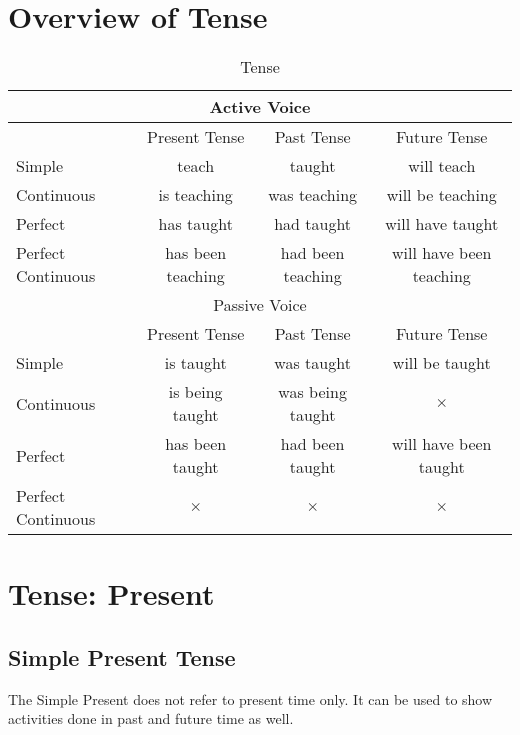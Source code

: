 \onecolumn
\section{Overview of Tense}
\begin{table}[h]
    \centering
    \begin{tabular}{|l|c|c|c|}
        \hline
        \multicolumn{4}{|c|}{Active Voice} \\ \hline
        & Present Tense & Past Tense & Future Tense \\ \hline
        Simple & teach & taught & will teach \\ \hline
        Continuous & is teaching & was teaching & will be teaching \\ \hline
        Perfect & has taught & had taught & will have taught \\ \hline
        Perfect Continuous & has been teaching & had been teaching & will have been teaching \\ \hline \hline
        \multicolumn{4}{|c|}{Passive Voice} \\ \hline
        & Present Tense & Past Tense & Future Tense \\ \hline
        Simple & is taught & was taught & will be taught \\ \hline
        Continuous & is being taught & was being taught & $\times$ \\ \hline
        Perfect & has been taught & had been taught & will have been taught \\ \hline
        Perfect Continuous & $\times$ & $\times$ & $\times$ \\ \hline
    \end{tabular}
    \caption{Tense}
\end{table}

\section{Tense: Present}
\subsection{Simple Present Tense}
The Simple Present does not refer to present time only.
It can be used to show activities done in past and future time as well.

